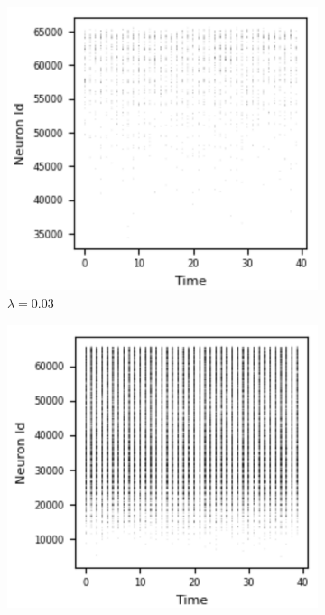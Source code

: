 \documentclass[12pt]{article}
\begin{document}
\begin{figure}[H]
\centering
  \begin{subfigure}[b]{0.35\textwidth}
    \includegraphics[width=\textwidth]{Figs/1}
    \caption{$\lambda = 0.03$}
  \end{subfigure}
  \hspace*{50}
  \begin{subfigure}[b]{0.35\textwidth}
    \includegraphics[width=\textwidth]{Figs/2}

\end{subfigure}
\end{figure}
\end{document}
